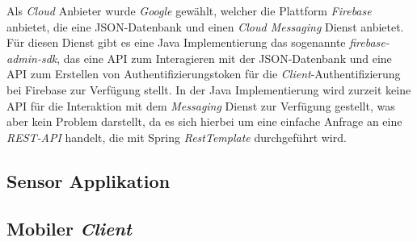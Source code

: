 \newline
\newline
Als \emph{Cloud} Anbieter wurde \emph{Google} gewählt, welcher die Plattform \emph{Firebase} anbietet, die eine JSON-Datenbank und einen \emph{Cloud Messaging} Dienst anbietet. Für diesen Dienst gibt es eine Java Implementierung das sogenannte \emph{firebase-admin-sdk}, das eine API zum Interagieren mit der JSON-Datenbank und eine API zum Erstellen von Authentifizierungstoken für die \emph{Client}-Authentifizierung bei Firebase zur Verfügung stellt. In der Java Implementierung wird zurzeit keine API für die Interaktion mit dem \emph{Messaging} Dienst zur Verfügung gestellt, was aber kein Problem darstellt, da es sich hierbei um eine einfache Anfrage an eine \emph{REST-API} handelt, die mit Spring \emph{RestTemplate} durchgeführt wird.

\subsection{Sensor Applikation}

\subsection{Mobiler \emph{Client}}
